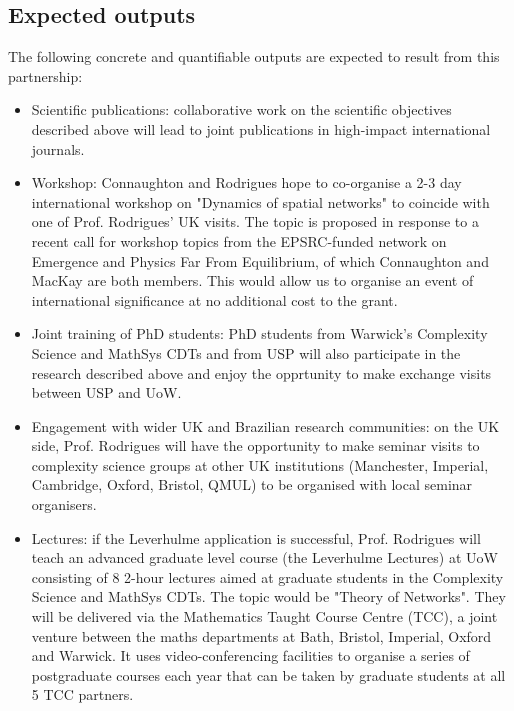 \subsection{Expected outputs}
The following concrete and quantifiable outputs are expected to result from 
this partnership:
\begin{itemize}
\item Scientific publications: collaborative work on the scientific objectives 
described above will lead to joint publications in high-impact international 
journals.
\item Workshop: Connaughton and Rodrigues hope to co-organise a 2-3 day 
international workshop on "Dynamics of spatial networks" to coincide with one 
of Prof. Rodrigues' UK visits. The topic is proposed in response to a recent 
call for workshop topics from the EPSRC-funded network on Emergence and Physics 
Far From Equilibrium, of which Connaughton and MacKay are both members. This 
would allow us to organise an event of international significance at no 
additional cost to the grant.
\item Joint training of PhD students: PhD students from Warwick's Complexity 
Science and MathSys CDTs and from USP will also participate in the research 
described above and enjoy the opprtunity to make exchange visits between USP 
and UoW.
\item Engagement with wider UK and Brazilian research communities: on the UK 
side, Prof. Rodrigues will have the opportunity to make seminar visits to 
complexity science groups at other UK institutions (Manchester, Imperial, 
Cambridge, Oxford, Bristol, QMUL)  to be organised with local seminar 
organisers.
\item Lectures:  if the Leverhulme application is successful, Prof. Rodrigues 
will teach an advanced graduate level course (the Leverhulme Lectures) at UoW 
consisting of 8 2-hour lectures aimed at graduate students in the Complexity 
Science and MathSys CDTs. The topic would be "Theory of Networks". They will be 
delivered via the Mathematics Taught Course Centre (TCC), a joint venture 
between the maths departments at Bath, Bristol, Imperial, Oxford and Warwick. 
It uses video-conferencing facilities to organise a series of postgraduate 
courses each year that can be taken by graduate students at all 5 TCC partners.
\end{itemize}

